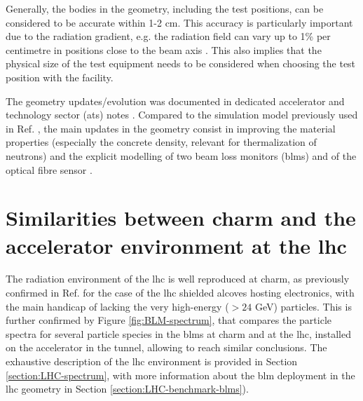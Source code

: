 \documentclass[encoding=utf8,british]{tumphthesis}
\begin{document}
Generally, the bodies in the geometry, including the test positions, can be considered to be accurate within 1-2 cm.  This accuracy is particularly important due to the radiation gradient, e.g. the radiation field can vary up to 1\% per centimetre in positions close to the beam axis \cite{Thornton:2149417}. This also implies that the physical size of the test equipment needs to be considered when choosing the test position with the facility. 

The geometry updates/evolution was documented in dedicated accelerator and technology sector (\acrshort{ats}) notes \cite{Thornton:2149417, Infantino:2291683}. Compared to the simulation model previously used in Ref. \cite{Mekki:2016tbj}, the main updates in the geometry consist in improving the material properties (especially the concrete density, relevant for thermalization of neutrons) and the explicit modelling of two beam loss monitors (\acrshort{blm}s) \cite{BLM:description} and of the optical fibre sensor \cite{Diego:OF}.


\section{Similarities between \acrshort{charm} and the accelerator environment at the \acrshort{lhc}}

\label{section:similarities-between-charm-and-the-accelerator-environment-at-the-lhc}
The radiation environment of the \acrshort{lhc} is well reproduced at \acrshort{charm}, as previously confirmed in Ref. \cite{Mekki:2016tbj} for the case of the \acrshort{lhc} shielded alcoves hosting electronics, with the main handicap of lacking the very high-energy ($> 24$ GeV) particles. This is further confirmed by Figure \ref{fig:BLM-spectrum}, that compares the particle spectra for several particle species in the \acrshort{blm}s at \acrshort{charm} and at the \acrshort{lhc}, installed on the accelerator in the tunnel, allowing to reach similar conclusions. The exhaustive description of the \acrshort{lhc} environment is provided in Section \ref{section:LHC-spectrum}, with more information about the \acrshort{blm} deployment in the \acrshort{lhc} geometry in Section \ref{section:LHC-benchmark-blms}).
\end{document}
